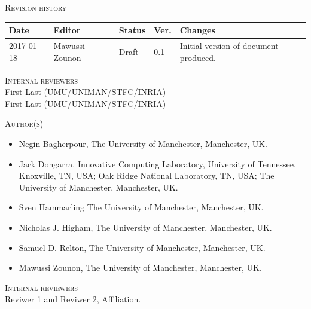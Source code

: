 \documentclass[a4paper,12pt]{article}
\begin{document}
\vspace{2em}


\noindent
\textsc{Revision history}\\[1em]
\begin{tabularx}{\linewidth}{@{}|l|l|l|l|X|}
  \hline
  \rowcolor{orange}
  \bf Date & \bf Editor & \bf Status & \bf Ver. & \bf Changes \\
  \hline
  2017-01-18 & Mawussi Zounon & Draft & 0.1 & Initial version of
                                             document produced. \\
  \hline
\end{tabularx}


\vspace{2em}

\noindent
\textsc{Internal reviewers}\\[1em]
First Last (UMU/UNIMAN/STFC/INRIA)\\
First Last (UMU/UNIMAN/STFC/INRIA)

\vspace{2em}



\noindent
\textsc{Author(s)}\\[1em]
\begin{itemize}
\item Negin Bagherpour, The University of Manchester, Manchester, UK.
\item Jack Dongarra. Innovative Computing Laboratory, University of Tennessee, Knoxville, 
TN, USA; Oak Ridge National Laboratory, TN, USA; The University of Manchester, Manchester, UK.
\item Sven Hammarling The University of Manchester, Manchester, UK.
\item Nicholas J. Higham, The University of Manchester, Manchester, UK.
\item Samuel D. Relton, The University of Manchester, Manchester, UK.
\item Mawussi Zounon, The University of Manchester, Manchester, UK.
\end{itemize}
\vspace{2em}



\noindent
\textsc{Internal reviewers}\\[1em]
Reviwer 1 and Reviwer 2, Affiliation.\\

\vspace{2em}
\end{document}
